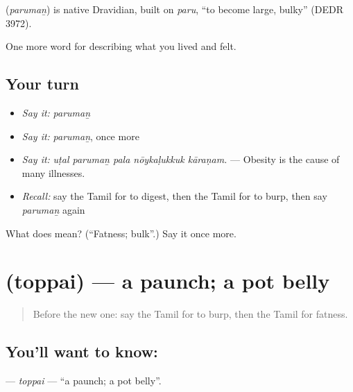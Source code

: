 \begin{cousinweb}
\textbf{} (\emph{parumaṉ}) is native Dravidian, built on  \emph{paru}, \textquotedblleft{}to become large, bulky\textquotedblright{} (DEDR 3972).
\end{cousinweb}

\begin{grammarlens}[title={What you've built}]
One more word for describing what you lived and felt.
\end{grammarlens}

\subsection*{Your turn}
\begin{itemize}
\raggedright
  \item \emph{Say it:} \emph{parumaṉ}
  \item \emph{Say it:} \emph{parumaṉ}, once more
  \item \emph{Say it:} \emph{uṭal parumaṉ pala nōykaḷukkuk kāraṇam.} — Obesity is the cause of many illnesses.
  \item \emph{Recall:} say the Tamil for to digest, then the Tamil for to burp, then say \emph{parumaṉ} again
\end{itemize}

\begin{tcolorbox}[breakable,colback=teal!4,colframe=teal!35!black,title={Before you move on}]
What does  mean? (\textquotedblleft{}Fatness; bulk\textquotedblright{}.) Say it once more.
\end{tcolorbox}
\section[\texorpdfstring{\ta{தொப்பை} (toppai)}{தொப்பை (toppai)}]{ (toppai) — a paunch; a pot belly}

\label{lesson:TA-C488-toppai}



\begin{quote}
Before the new one: say the Tamil for to burp, then the Tamil for fatness.
\end{quote}

\subsection*{You'll want to know: }
\textbf{} — \emph{toppai} — \textquotedblleft{}a paunch; a pot belly\textquotedblright{}.

